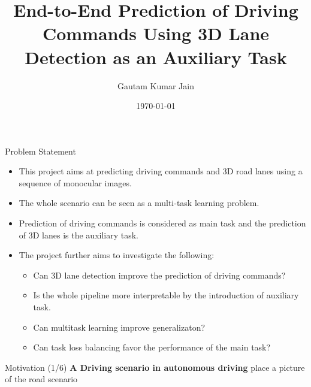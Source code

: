 \documentclass[aspectratio=169]{beamer}
\author[Jain]{Gautam Kumar Jain}
\title{End-to-End Prediction of Driving
Commands Using 3D Lane Detection as an
Auxiliary Task}
\institute[HBRS]{Hochschule Bonn-Rhein-Sieg}
\date{\today}
\begin{document}
{
\begin{frame}
\titlepage
\end{frame}
}

\begin{frame}{Problem Statement}
    \begin{itemize}
        \item This project aims at predicting driving commands and 3D road lanes using a sequence of monocular images.
        \item The whole scenario can be seen as a multi-task learning problem.
        \item Prediction of driving commands is considered as main task and the prediction of 3D lanes is the auxiliary task.
        \item The project further aims to investigate the following: 
        \begin{itemize}
            \item Can 3D lane detection improve the prediction of driving commands? 
            \item Is the whole pipeline more interpretable by the introduction of auxiliary task.
            \item Can multitask learning improve generalizaton? 
            \item Can task loss balancing favor the performance of the main task? 
        \end{itemize}
    \end{itemize}
\end{frame}
\begin{frame}{Motivation (1/6)}
  \textbf{A Driving scenario in autonomous driving}
  place a picture of the road scenario
\end{frame}
\end{document}
